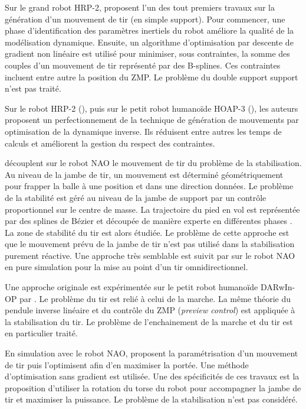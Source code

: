 Sur le grand robot HRP-2, \cite{miossec_development_2006} proposent 
l'un des tout premiers travaux sur la génération d'un mouvement de tir
(en simple support).
Pour commencer, une phase d'identification des paramètres inertiels
du robot améliore la qualité de la modélisation dynamique.
Ensuite, un algorithme d'optimisation par descente de gradient non linéaire
est utilisé pour minimiser, sous contraintes, la somme des couples
d'un mouvement de tir représenté par des B-splines.
Ces contraintes incluent entre autre la position du ZMP.
Le problème du double support support n'est pas traité.

Sur le robot HRP-2 (\cite{lengagne_generation_2010}), puis
sur le petit robot humanoïde HOAP-3 (\cite{lengagne_planning_2011}), 
les auteurs proposent un perfectionnement de la technique de génération 
de mouvements par optimisation de la dynamique inverse. 
Ils réduisent entre autres les temps de calculs et améliorent la gestion
du respect des contraintes.

\cite{xu_adaptive_2010} découplent sur le robot NAO le mouvement 
de tir du problème de la stabilisation.
Au niveau de la jambe de tir, un mouvement est déterminé géométriquement
pour frapper la balle à une position et dans une direction données.
Le problème de la stabilité est géré au niveau de la jambe de support par
un contrôle proportionnel sur le centre de masse.
La trajectoire du pied en vol est représentée par des splines de Bézier
et découpée de manière experte en différentes \og phases \fg.
La zone de stabilité du tir est alors étudiée.
Le problème de cette approche est que le mouvement prévu de la jambe
de tir n'est pas utilisé dans la stabilisation purement réactive.
Une approche très semblable est suivit par \cite{ferreira_development_2012}
sur le robot NAO en pure simulation pour la mise au point d'un tir omnidirectionnel.

Une approche originale est expérimentée sur le petit robot humanoïde
DARwIn-OP par \cite{yi_improved_2013}. Le problème du tir est relié à celui
de la marche. La même théorie du pendule inverse linéaire et du contrôle
du ZMP (\textit{preview control}) est appliquée à la stabilisation du tir. 
Le problème de l'enchainement de la marche et du tir est en particulier traité.

En simulation avec le robot NAO, \cite{jouandeau_optimization_2014} proposent
la paramétrisation d'un mouvement de tir puis l'optimisent
afin d'en maximiser la portée. 
Une méthode d'optimisation sans gradient est utilisée.
Une des spécificités de ces travaux est la
proposition d'utiliser la rotation du torse du robot pour accompagner 
la jambe de tir et maximiser la puissance.
Le problème de la stabilisation n'est pas considéré.

